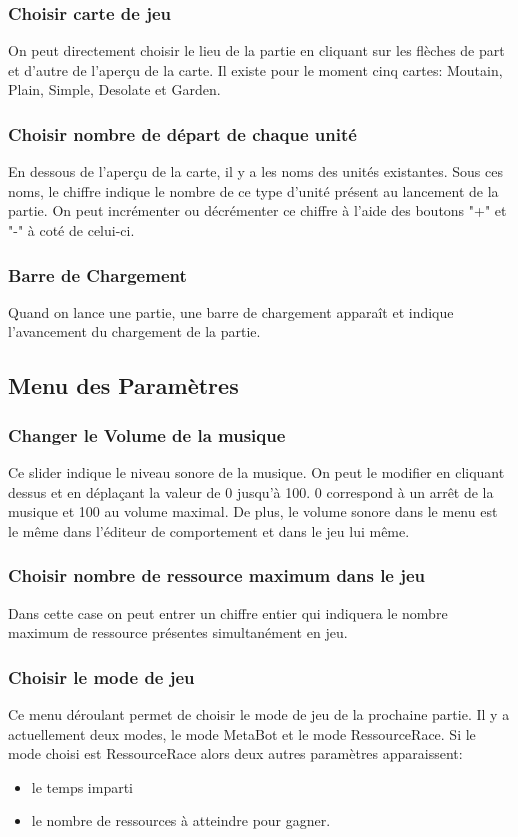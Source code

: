 \documentclass{report}
\begin{document}
\subsubsection{Choisir carte de jeu}
On peut directement choisir le lieu de la partie en cliquant sur les flèches de part et d'autre de l’aperçu de la carte. Il existe pour le moment cinq cartes: Moutain, Plain, Simple, Desolate et Garden.
\subsubsection{Choisir nombre de départ de chaque unité}
En dessous de l’aperçu de la carte, il y a les noms des unités existantes. Sous ces noms, le chiffre indique le nombre de ce type d'unité présent au lancement de la partie. On peut incrémenter ou décrémenter ce chiffre à l'aide des boutons "+" et "-" à coté de celui-ci.
\subsubsection{Barre de Chargement}
Quand on lance une partie, une barre de chargement apparaît et indique l'avancement du chargement de la partie.

\subsection{Menu des Paramètres}
\subsubsection{Changer le Volume de la musique}
Ce slider indique le niveau sonore de la musique. On peut le modifier en cliquant dessus et en déplaçant la valeur de 0 jusqu’à 100. 0 correspond à un arrêt de la musique et 100 au volume maximal. De plus, le volume sonore dans le menu est le même dans l'éditeur de comportement et dans le jeu lui même.
\subsubsection{Choisir nombre de ressource maximum dans le jeu}
Dans cette case on peut entrer un chiffre entier qui indiquera le nombre maximum de ressource présentes simultanément en jeu.
\subsubsection{Choisir le mode de jeu}
Ce menu déroulant permet de choisir le mode de jeu de la prochaine partie. Il y a actuellement deux modes, le mode MetaBot et le mode RessourceRace. Si le mode choisi est RessourceRace alors deux autres paramètres apparaissent:
\begin{itemize}
\item le temps imparti
\item le nombre de ressources à atteindre pour gagner.
\end{itemize}
\end{document}
